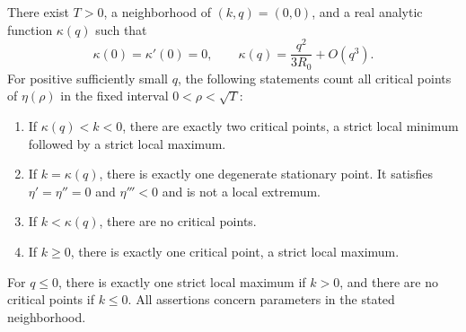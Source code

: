 \begin{theorem}
\label{turn:thm:fold}
There exist $T>0$, a neighborhood of $(k,q)=(0,0)$, and a real
analytic function $\kappa(q)$ such that
\begin{equation}
 \kappa(0)=\kappa'(0)=0,
 \qquad
 \kappa(q)=\frac{q^2}{3R_0}+O(q^3).
 \label{turn:eq:fold-curve}
\end{equation}
For positive sufficiently small $q$, the following statements count
all critical points of $\eta(\rho)$ in the fixed interval
$0<\rho<\sqrt T$:
\begin{enumerate}
 \item If $\kappa(q)<k<0$, there are exactly two critical points,
       a strict local minimum followed by a strict local maximum.
 \item If $k=\kappa(q)$, there is exactly one degenerate stationary
       point.  It satisfies $\eta'=\eta''=0$ and $\eta'''<0$ and is
       not a local extremum.
 \item If $k<\kappa(q)$, there are no critical points.
 \item If $k\ge0$, there is exactly one critical point, a strict
       local maximum.
\end{enumerate}
For $q\le0$, there is exactly one strict local maximum if $k>0$,
and there are no critical points if $k\le0$.  All assertions concern
parameters in the stated neighborhood.
\end{theorem}

